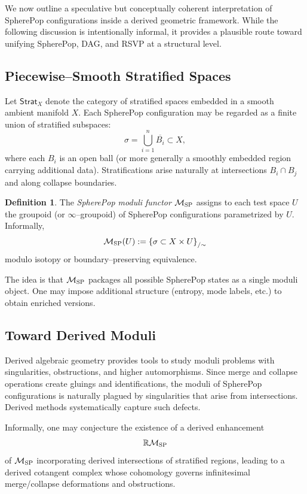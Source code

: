 \documentclass[12pt]{article}
\theoremstyle{plain}
\theoremstyle{definition}
\newtheorem{definition}[theorem]{Definition}
\theoremstyle{remark}
\begin{document}
We now outline a speculative but conceptually coherent interpretation of
SpherePop configurations inside a derived geometric framework. While the
following discussion is intentionally informal, it provides a plausible route
toward unifying SpherePop, DAG, and RSVP at a structural level.


\subsection{Piecewise--Smooth Stratified Spaces}

Let $\mathsf{Strat}_X$ denote the category of stratified spaces embedded in a
smooth ambient manifold $X$. Each SpherePop configuration may be regarded as a
finite union of stratified subspaces:
\[
    \sigma = \bigcup_{i=1}^n \overline{B_i} \subset X,
\]
where each $B_i$ is an open ball (or more generally a smoothly embedded region
carrying additional data). Stratifications arise naturally at intersections
$B_i\cap B_j$ and along collapse boundaries.

\begin{definition}
The \emph{SpherePop moduli functor} $\mathcal{M}_{\rm SP}$ assigns to each test
space $U$ the groupoid (or $\infty$--groupoid) of SpherePop configurations
parametrized by $U$. Informally,
\[
    \mathcal{M}_{\rm SP}(U)
    := \left\{
        \sigma \subset X\times U
    \right\}_{/\sim}
\]
modulo isotopy or boundary--preserving equivalence.
\end{definition}

The idea is that $\mathcal{M}_{\rm SP}$ packages all possible SpherePop states
as a single moduli object. One may impose additional structure (entropy,
mode labels, etc.) to obtain enriched versions.


\subsection{Toward Derived Moduli}

Derived algebraic geometry provides tools to study moduli problems with
singularities, obstructions, and higher automorphisms. Since merge and collapse
operations create gluings and identifications, the moduli of SpherePop
configurations is naturally plagued by singularities that arise from
intersections. Derived methods systematically capture such defects.

Informally, one may conjecture the existence of a derived enhancement
\[
    \mathbb{R}\mathcal{M}_{\rm SP}
\]
of $\mathcal{M}_{\rm SP}$ incorporating derived intersections of stratified
regions, leading to a derived cotangent complex whose cohomology governs
infinitesimal merge/collapse deformations and obstructions.
\end{document}
